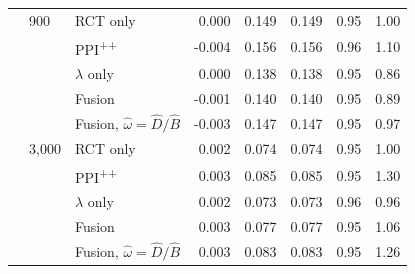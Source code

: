 \begin{table}[h]
\begin{center}
\begin{tabular}{@{}lllrrrrr@{}}
\addlinespace
 & 900 & RCT only & 0.000 & 0.149 & 0.149 & 0.95 & 1.00 \\
 &  & PPI\textsuperscript{++} & -0.004 & 0.156 & 0.156 & 0.96 & 1.10 \\
 &  & $\lambda$ only & 0.000 & 0.138 & 0.138 & 0.95 & 0.86 \\
 &  & Fusion & -0.001 & 0.140 & 0.140 & 0.95 & 0.89 \\
 &  & Fusion, $\hat\omega=\hat D/\hat B$ & -0.003 & 0.147 & 0.147 & 0.95 & 0.97 \\
\addlinespace
 & 3{,}000 & RCT only & 0.002 & 0.074 & 0.074 & 0.95 & 1.00 \\
 &  & PPI\textsuperscript{++} & 0.003 & 0.085 & 0.085 & 0.95 & 1.30 \\
 &  & $\lambda$ only & 0.002 & 0.073 & 0.073 & 0.96 & 0.96 \\
 &  & Fusion & 0.003 & 0.077 & 0.077 & 0.95 & 1.06 \\
 &  & Fusion, $\hat\omega=\hat D/\hat B$ & 0.003 & 0.083 & 0.083 & 0.95 & 1.26 \\
\bottomrule
\end{tabular}
\end{center}
\end{table}
